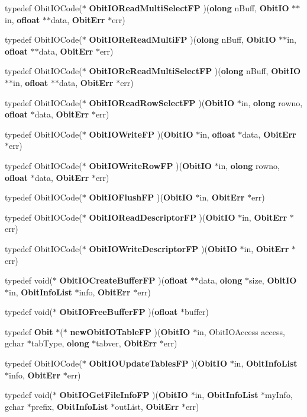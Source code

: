 \begin{CompactItemize}
typedef Obit\-IOCode($\ast$ {\bf Obit\-IORead\-Multi\-Select\-FP} )({\bf olong} n\-Buff, {\bf Obit\-IO} $\ast$$\ast$in, {\bf ofloat} $\ast$$\ast$data, {\bf Obit\-Err} $\ast$err)
\item 
typedef Obit\-IOCode($\ast$ {\bf Obit\-IORe\-Read\-Multi\-FP} )({\bf olong} n\-Buff, {\bf Obit\-IO} $\ast$$\ast$in, {\bf ofloat} $\ast$$\ast$data, {\bf Obit\-Err} $\ast$err)
\item 
typedef Obit\-IOCode($\ast$ {\bf Obit\-IORe\-Read\-Multi\-Select\-FP} )({\bf olong} n\-Buff, {\bf Obit\-IO} $\ast$$\ast$in, {\bf ofloat} $\ast$$\ast$data, {\bf Obit\-Err} $\ast$err)
\item 
typedef Obit\-IOCode($\ast$ {\bf Obit\-IORead\-Row\-Select\-FP} )({\bf Obit\-IO} $\ast$in, {\bf olong} rowno, {\bf ofloat} $\ast$data, {\bf Obit\-Err} $\ast$err)
\item 
typedef Obit\-IOCode($\ast$ {\bf Obit\-IOWrite\-FP} )({\bf Obit\-IO} $\ast$in, {\bf ofloat} $\ast$data, {\bf Obit\-Err} $\ast$err)
\item 
typedef Obit\-IOCode($\ast$ {\bf Obit\-IOWrite\-Row\-FP} )({\bf Obit\-IO} $\ast$in, {\bf olong} rowno, {\bf ofloat} $\ast$data, {\bf Obit\-Err} $\ast$err)
\item 
typedef Obit\-IOCode($\ast$ {\bf Obit\-IOFlush\-FP} )({\bf Obit\-IO} $\ast$in, {\bf Obit\-Err} $\ast$err)
\item 
typedef Obit\-IOCode($\ast$ {\bf Obit\-IORead\-Descriptor\-FP} )({\bf Obit\-IO} $\ast$in, {\bf Obit\-Err} $\ast$err)
\item 
typedef Obit\-IOCode($\ast$ {\bf Obit\-IOWrite\-Descriptor\-FP} )({\bf Obit\-IO} $\ast$in, {\bf Obit\-Err} $\ast$err)
\item 
typedef void($\ast$ {\bf Obit\-IOCreate\-Buffer\-FP} )({\bf ofloat} $\ast$$\ast$data, {\bf olong} $\ast$size, {\bf Obit\-IO} $\ast$in, {\bf Obit\-Info\-List} $\ast$info, {\bf Obit\-Err} $\ast$err)
\item 
typedef void($\ast$ {\bf Obit\-IOFree\-Buffer\-FP} )({\bf ofloat} $\ast$buffer)
\item 
typedef {\bf Obit} $\ast$($\ast$ {\bf new\-Obit\-IOTable\-FP} )({\bf Obit\-IO} $\ast$in, Obit\-IOAccess access, gchar $\ast$tab\-Type, {\bf olong} $\ast$tabver, {\bf Obit\-Err} $\ast$err)
\item 
typedef Obit\-IOCode($\ast$ {\bf Obit\-IOUpdate\-Tables\-FP} )({\bf Obit\-IO} $\ast$in, {\bf Obit\-Info\-List} $\ast$info, {\bf Obit\-Err} $\ast$err)
\item 
typedef void($\ast$ {\bf Obit\-IOGet\-File\-Info\-FP} )({\bf Obit\-IO} $\ast$in, {\bf Obit\-Info\-List} $\ast$my\-Info, gchar $\ast$prefix, {\bf Obit\-Info\-List} $\ast$out\-List, {\bf Obit\-Err} $\ast$err)
\end{CompactItemize}

